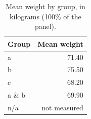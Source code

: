 \begin{table}[htbp]
\centering
\caption{Mean weight by group, in kilograms (100\% of the panel).}
\label{tab:mean-weight}
\begin{tabular}{lr}
\toprule
Group & Mean weight \\
\midrule
a & 71.40 \\
b & 75.50 \\
c & 68.20 \\
a \& b & 69.90 \\
n/a & not measured \\
\bottomrule
\end{tabular}
\end{table}
